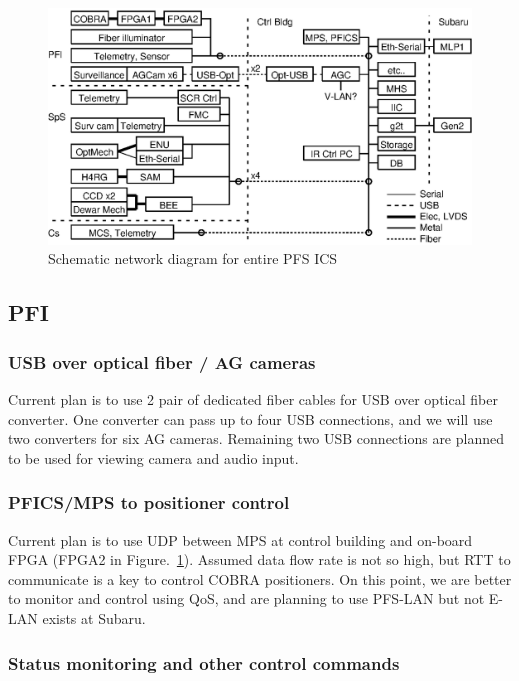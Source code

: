 \documentclass[a4paper,notitlepage]{article}
\begin{document}
\begin{figure}[htb]
  \begin{center}
    \includegraphics{networks-list.eps}
  \end{center}
  \caption{Schematic network diagram for entire PFS ICS}
  \label{fig:network}
\end{figure}

\subsection{PFI}

\subsubsection{USB over optical fiber / AG cameras}

Current plan is to use 2 pair of dedicated fiber cables for USB over optical 
fiber converter. 
One converter can pass up to four USB connections, and we will use two 
converters for six AG cameras. 
Remaining two USB connections are planned to be used for viewing camera 
and audio input. 

\subsubsection{PFICS/MPS to positioner control}

Current plan is to use UDP between MPS at control building and on-board FPGA 
(FPGA2 in Figure.~\ref{fig:network}). 
Assumed data flow rate is not so high, but RTT to communicate is a key 
to control COBRA positioners. On this point, we are better to 
monitor and control using QoS, and are planning to use PFS-LAN but not E-LAN 
exists at Subaru. 

\subsubsection{Status monitoring and other control commands}
\end{document}
